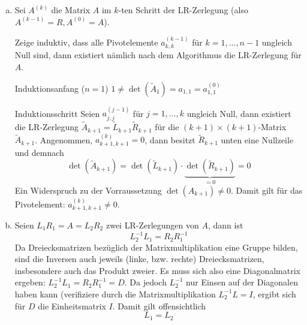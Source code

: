 \documentclass[a4paper]{scrartcl}
\begin{document}
\begin{aufgabe}
	\begin{enumerate}[a)]
		\item
			Sei $A^{(k)}$ die Matrix $A$ im $k$-ten Schritt der LR-Zerlegung (also $A^{(k-1)}=R, A^{(0)}=A$).

			Zeige induktiv, dass alle Pivotelemente $a_{k,k}^{(k-1)}$ für $k=1,\dotsc,n-1$ ungleich Null sind, dann existiert nämlich nach dem Algorithmus die LR-Zerlegung für $A$.

			\begin{seg}{Induktionsanfang ($n=1$)}
				$\displaystyle 1 \neq \det(\tilde A_1) = a_{1,1} = a_{1,1}^{(0)}$
			\end{seg}
			\begin{seg}{Induktionsschritt}
				Seien $a_{j,j}^{(j-1)}$ für $j=1,\dotsc,k$ ungleich Null, dann existiert die LR-Zerlegung $\tilde A_{k+1} = \tilde L_{k+1} \tilde R_{k+1}$ für die $(k+1)\times (k+1)$-Matrix $\tilde A_{k+1}$.
				Angenommen, $a_{k+1,k+1}^{(k)} = 0$, dann besitzt $\tilde R_{k+1}$ unten eine Nullzeile und demnach
				\[
					\det(\tilde A_{k+1}) = \det(\tilde L_{k+1}) \cdot \underbrace{\det(\tilde R_{k+1})}_{=0} = 0
				\]
				Ein Widerspruch zu der Vorraussetzung $\det(A_{k+1}) \neq 0$.
				Damit gilt für das Pivotelement: $a_{k+1,k+1}^{(k)} \neq 0$.
			\end{seg}
		\item
			Seien $L_1R_1 = A = L_2R_2$ zwei LR-Zerlegungen von $A$, dann ist
			\[
				L_2^{-1}L_1 = R_2R_1^{-1}
			\]
			Da Dreiecksmatrizen bezüglich der Matrixmultiplikation eine Gruppe bilden, sind die Inversen auch jeweils (linke, bzw. rechte) Dreiecksmatrizen, insbesondere auch das Produkt zweier.
			Es muss sich also eine Diagonalmatrix ergeben: $L_2^{-1}L_1 = R_2R_1^{-1} = D$.
			Da jedoch $L_2^{-1}$ nur Einsen auf der Diagonalen haben kann (verifiziere durch die Matrixmultiplikation $L_2^{-1}L = I$, ergibt sich für $D$ die Einheitsmatrix $I$.
			Damit gilt offensichtlich
			\[
				L_1 = L_2
			\]
	\end{enumerate}
\end{aufgabe}
\end{document}
